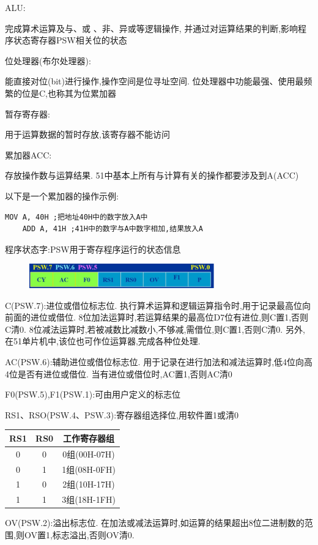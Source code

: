 \documentclass[12pt,a4paper,oneside]{ctexart}
\begin{document}
ALU:

完成算术运算及与、或 、非、异或等逻辑操作,
并通过对运算结果的判断,影响程序状态寄存器PSW相关位的状态

位处理器(布尔处理器):

能直接对位(bit)进行操作,操作空间是位寻址空间.
位处理器中功能最强、使用最频繁的位是C,也称其为位累加器

暂存寄存器:

用于运算数据的暂时存放,该寄存器不能访问

累加器ACC:

存放操作数与运算结果.
51中基本上所有与计算有关的操作都要涉及到A(ACC)

以下是一个累加器的操作示例:
\begin{lstlisting}[language=MCS51]
    MOV A, 40H ;把地址40H中的数字放入A中
    ADD A, 41H ;41H中的数字与A中数字相加,结果放入A
\end{lstlisting}

程序状态字:PSW用于寄存程序运行的状态信息
\begin{figure}[H]
    \centering
    \includegraphics[width=8cm]{photos/PSW.png}
\end{figure}

C(PSW.7):进位或借位标志位.
执行算术运算和逻辑运算指令时,用于记录最高位向前面的进位或借位.
8位加法运算时,若运算结果的最高位D7位有进位,则C置1,否则C清0.
8位减法运算时,若被减数比减数小,不够减,需借位,则C置1,否则C清0.
另外,在51单片机中,该位也可作位运算器,完成各种位处理.

AC(PSW.6):辅助进位或借位标志位.
用于记录在进行加法和减法运算时,低4位向高4位是否有进位或借位.
当有进位或借位时,AC置1,否则AC清0

F0(PSW.5),F1(PSW.1):可由用户定义的标志位

RS1、RSO(PSW.4、PSW.3):寄存器组选择位,用软件置1或清0
\begin{table}[H]
    \centering
    \begin{tabular}{|c|c|c|}
    \hline
    RS1 & RS0 & 工作寄存器组      \\ \hline
    0   & 0   & 0组(00H-07H) \\ \hline
    0   & 1   & 1组(08H-0FH) \\ \hline
    1   & 0   & 2组(10H-17H) \\ \hline
    1   & 1   & 3组(18H-1FH) \\ \hline
    \end{tabular}
    \end{table}
OV(PSW.2):溢出标志位.
在加法或减法运算时,如运算的结果超出8位二进制数的范围,则OV置1,标志溢出,否则OV清0.
\end{document}
